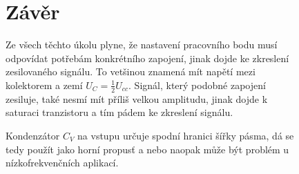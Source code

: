\documentclass{article}
\begin{document}
\begin{figure}[H]
  \begin{minipage}[t]{\textwidth}
    \section{Závěr}
    Ze všech těchto úkolu plyne, že nastavení pracovního bodu musí odpovídat potřebám konkrétního zapojení, jinak dojde ke zkreslení zesilovaného signálu.
    To vetšinou znamená mít napětí mezi kolektorem a zemí \(U_C = \frac{1}{2}U_{cc}\).
    Signál, který podobné zapojení zesiluje, také nesmí mít příliš velkou amplitudu, jinak dojde k saturaci tranzistoru a tím pádem ke zkreslení signálu.

    Kondenzátor \(C_V\) na vstupu určuje spodní hranici šířky pásma, dá se tedy použít jako horní propusť a nebo naopak může být problém u nízkofrekvenčních aplikací.

  \end{minipage}
\end{figure}
\end{document}
